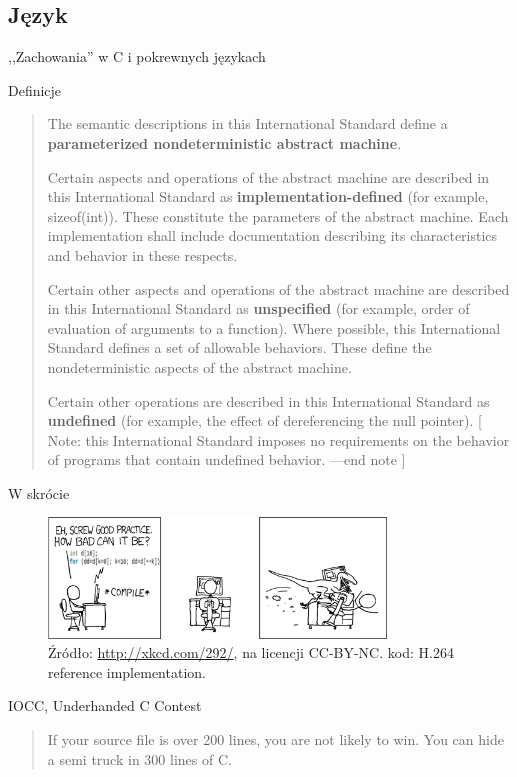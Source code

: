 \subsection{Język}
\begin{frame}{,,Zachowania'' w C i pokrewnych językach}
	\begin{block}{Definicje}
		\small\begin{quote}
			The semantic descriptions in this International Standard define a \textbf{parameterized nondeterministic abstract machine}.

			Certain aspects and operations of the abstract machine are described in this International Standard as \textbf{implementation-defined} (for example, sizeof(int)). These constitute the parameters of the abstract machine. Each implementation shall include documentation describing its characteristics and behavior in these respects.

			Certain other aspects and operations of the abstract machine are described in this International Standard as  \textbf{unspecified} (for example, order of evaluation of arguments to a function). Where possible, this International Standard defines a set of allowable behaviors. These define the nondeterministic aspects of the abstract machine.

			Certain other operations are described in this International Standard as  \textbf{undefined} (for example, the effect of dereferencing the null pointer). [ Note: this International Standard imposes no requirements on the behavior of programs that contain undefined behavior. —end note ]
		\end{quote}
	\end{block}
	\begin{block}{W skrócie}
		\begin{figure}[h]
			\includegraphics[width=0.8\textwidth]{gfx/undef_xkcd}
			\caption{Źródło: \url{http://xkcd.com/292/}, na licencji CC-BY-NC. kod: H.264 reference implementation.}
		\end{figure}
	\end{block}
	\begin{block}{IOCC, Underhanded C Contest}
		\begin{quote}
			If your source file is over 200 lines, you are not likely to win. You can hide a semi truck in 300 lines of C.
		\end{quote}
	\end{block}
\end{frame}

